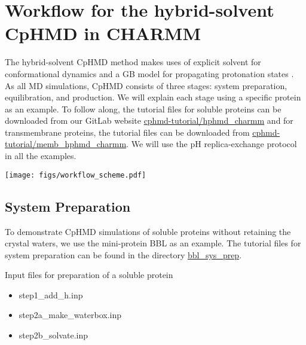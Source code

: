 \section{Workflow for the hybrid-solvent CpHMD in CHARMM} 
The hybrid-solvent CpHMD method makes uses of explicit solvent for conformational dynamics and a GB model for propagating protonation states
\cite{Wallace_Shen_2011_J.Chem.TheoryComput.}.
As all MD simulations, CpHMD consists of three stages: system preparation, equilibration, and production.
We will explain each stage using a specific protein as an example. 
To follow along, the tutorial files for soluble proteins can be 
downloaded from our GitLab website \href{https://gitlab.com/shenlab-amber-cphmd/cphmd-tutorial/-/tree/main/hphmd_charmm}{cphmd-tutorial/hphmd\_charmm}
and for transmembrane proteins, 
the tutorial files can be downloaded from \href{https://gitlab.com/shenlab-amber-cphmd/cphmd-tutorial/-/tree/main/memb_hphmd_charmm}{cphmd-tutorial/memb\_hphmd\_charmm}.
We will use the pH replica-exchange protocol \cite{Wallace_Shen_2011_J.Chem.TheoryComput.}
in all the examples.

\begin{figure*}[htb!]
    \centering
    \texttt{[image: figs/workflow\_scheme.pdf]}
    \caption{\textbf{Overview of the CpHMD workflow} 
    }
    \label{fig:intro}
\end{figure*}


\subsection{System Preparation}

To demonstrate CpHMD simulations of 
soluble proteins without retaining the crystal waters,
we use the mini-protein BBL as an example.
The tutorial files for system preparation can be found 
in the directory
\href{https://gitlab.com/shenlab-amber-cphmd/cphmd-tutorial/-/tree/main/hphmd_charmm/bbl_sys_prep}{bbl\_sys\_prep}.

\begin{checklist}{Input files for preparation of a soluble protein}
\begin{itemize}
\item step1\_add\_h.inp
\item step2a\_make\_waterbox.inp
\item step2b\_solvate.inp 
\end{itemize}
\end{checklist}

